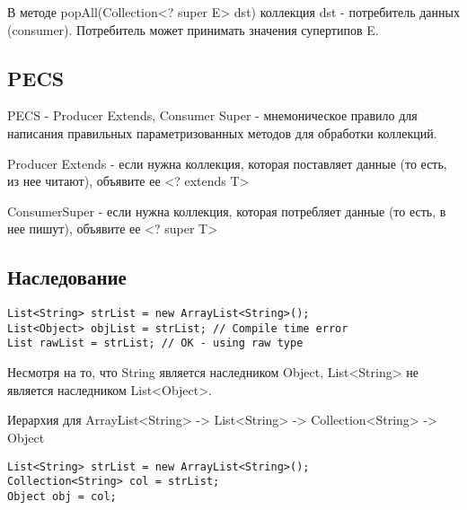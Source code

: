 \documentclass[a4paper,12pt]{extreport}
\begin{document}
В методе popAll(Collection<? super E> dst) коллекция dst - потребитель данных (consumer). Потребитель может принимать значения супертипов E. 

\subsection*{PECS}
PECS - Producer Extends, Consumer Super - мнемоническое правило для написания правильных параметризованных методов для обработки коллекций.

Producer Extends - если нужна коллекция, которая поставляет данные (то есть, из нее читают), объявите ее <? extends T> 

ConsumerSuper - если нужна коллекция, которая потребляет данные (то есть, в нее пишут), объявите ее <? super T>

\subsection*{Наследование}
\begin{lstlisting}
List<String> strList = new ArrayList<String>();  
List<Object> objList = strList; // Compile time error
List rawList = strList; // OK - using raw type
\end{lstlisting}

Несмотря на то, что String является наследником Object, List<String> не является наследником List<Object>. 

Иерархия для ArrayList<String> -> List<String> -> Collection<String> -> Object
\begin{lstlisting}
List<String> strList = new ArrayList<String>();  
Collection<String> col = strList;
Object obj = col;
\end{lstlisting}


\newpage
\end{document}
